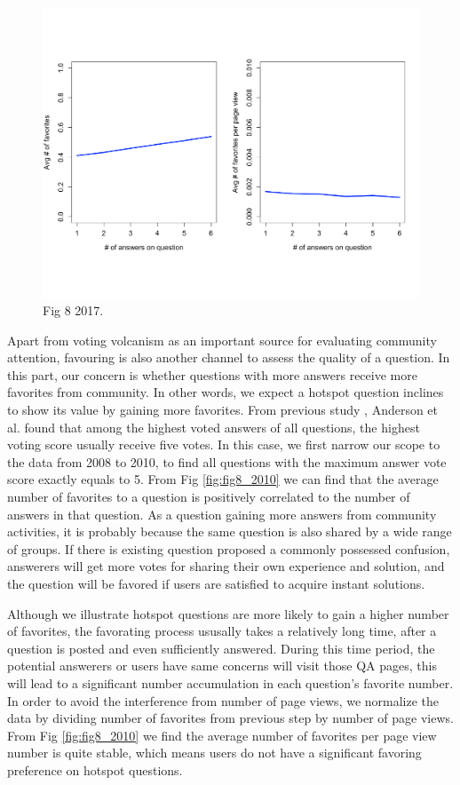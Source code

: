 \begin{figure}[!t]
	\centering
	\includegraphics[width=\columnwidth]{img/Fig8_2017.pdf}
	\caption{Fig 8 2017.}
	\label{fig:fig8_2017}
\end{figure}

Apart from voting volcanism as an important source for evaluating community attention, favouring is also another channel to assess the quality of a question. In this part, our concern is whether questions with more answers receive more favorites from community. In other words, we expect a hotspot question inclines to show its value by gaining more favorites. From previous study \cite{anderson2012discovering}, Anderson et al. found that among the highest voted answers of all questions, the highest voting score usually receive five votes. In this case, we first narrow our scope to the data from 2008 to 2010, to find all questions with the maximum answer vote score exactly equals to 5. From Fig \ref{fig:fig8_2010} we can find that the average number of favorites to a question is positively correlated to the number of answers in that question. As a question gaining more answers from community activities, it is probably because the same question is also shared by a wide range of groups. If there is existing question proposed a commonly possessed confusion, answerers will get more votes for sharing their own experience and solution, and the question will be favored if users are satisfied to acquire instant solutions. 

Although we illustrate hotspot questions are more likely to gain a higher number of favorites, the favorating process ususally takes a relatively long time, after a question is posted and even sufficiently answered. During this time period, the potential answerers or users have same concerns will visit those QA pages, this will lead to a significant number accumulation in each question's favorite number. In order to avoid the interference from number of page views, we normalize the data by dividing number of favorites from previous step by number of page views. From Fig \ref{fig:fig8_2010} we find the average number of favorites per page view number is quite stable, which means users do not have a significant favoring preference on hotspot questions. 

